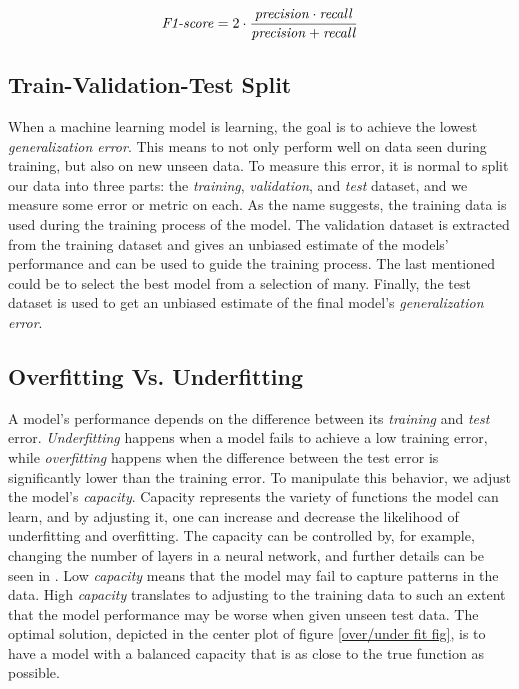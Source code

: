         \begin{equation}
            \textrm{\textit{F1-score}} = 2 \cdot \dfrac{\textrm{\textit{precision}} \cdot \textrm{\textit{recall}}}{\textrm{\textit{precision}} + \textrm{\textit{recall}}}
        \end{equation}
        
    \subsection{Train-Validation-Test Split}
        When a machine learning model is learning, the goal is to achieve the lowest \textit{generalization error}. This means to not only perform well on data seen during training, but also on new unseen data. To measure this error, it is normal to split our data into three parts: the \textit{training}, \textit{validation}, and \textit{test} dataset, and we measure some error or metric on each. As the name suggests, the training data is used during the training process of the model. The validation dataset is extracted from the training dataset and gives an unbiased estimate of the models' performance and can be used to guide the training process. The last mentioned could be to select the best model from a selection of many. Finally, the test dataset is used to get an unbiased estimate of the final model's \textit{generalization error}\cite{Goodfellow-et-al-2016}.
    
    \subsection{Overfitting Vs. Underfitting}
        A model's performance depends on the difference between its \textit{training} and \textit{test} error. \textit{Underfitting} happens when a model fails to achieve a low training error, while \textit{overfitting} happens when the difference between the test error is significantly lower than the training error. To manipulate this behavior, we adjust the model's \textit{capacity}. Capacity represents the variety of functions the model can learn, and by adjusting it, one can increase and decrease the likelihood of underfitting and overfitting. The capacity can be controlled by, for example, changing the number of layers in a neural network, and further details can be seen in \citeauthor{Goodfellow-et-al-2016}\cite{Goodfellow-et-al-2016}. Low \textit{capacity} means that the model may fail to capture patterns in the data. High \textit{capacity} translates to adjusting to the training data to such an extent that the model performance may be worse when given unseen test data. The optimal solution, depicted in the center plot of figure \ref{over/under fit fig}, is to have a model with a balanced capacity that is as close to the true function as possible\cite{Goodfellow-et-al-2016}. 
        
